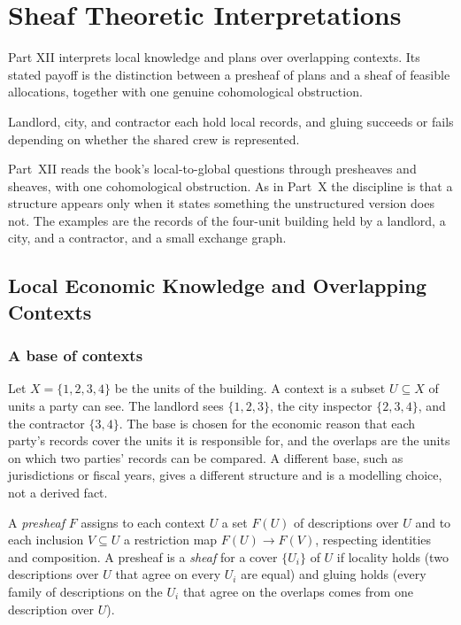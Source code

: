 \part{Sheaf Theoretic Interpretations}
\label{part:XII}

Part XII interprets local knowledge and plans over overlapping contexts. Its stated payoff is the distinction between a presheaf of plans and a sheaf of feasible allocations, together with one genuine cohomological obstruction.

\begin{housing}Landlord, city, and contractor each hold local records, and gluing succeeds or fails depending on whether the shared crew is represented.\end{housing}


Part~XII reads the book's local-to-global questions through presheaves and sheaves, with one cohomological obstruction. As in Part~X the discipline is that a structure appears only when it states something the unstructured version does not. The examples are the records of the four-unit building held by a landlord, a city, and a contractor, and a small exchange graph.

\chapter{Local Economic Knowledge and Overlapping Contexts}\label{ch:56}

\section{A base of contexts}

Let $X=\{1,2,3,4\}$ be the units of the building. A context is a subset $U\subseteq X$ of units a party can see. The landlord sees $\{1,2,3\}$, the city inspector $\{2,3,4\}$, and the contractor $\{3,4\}$. The base is chosen for the economic reason that each party's records cover the units it is responsible for, and the overlaps are the units on which two parties' records can be compared. A different base, such as jurisdictions or fiscal years, gives a different structure and is a modelling choice, not a derived fact.

A \emph{presheaf} $F$ assigns to each context $U$ a set $F(U)$ of descriptions over $U$ and to each inclusion $V\subseteq U$ a restriction map $F(U)\to F(V)$, respecting identities and composition. A presheaf is a \emph{sheaf} for a cover $\{U_i\}$ of $U$ if locality holds (two descriptions over $U$ that agree on every $U_i$ are equal) and gluing holds (every family of descriptions on the $U_i$ that agree on the overlaps comes from one description over $U$).

